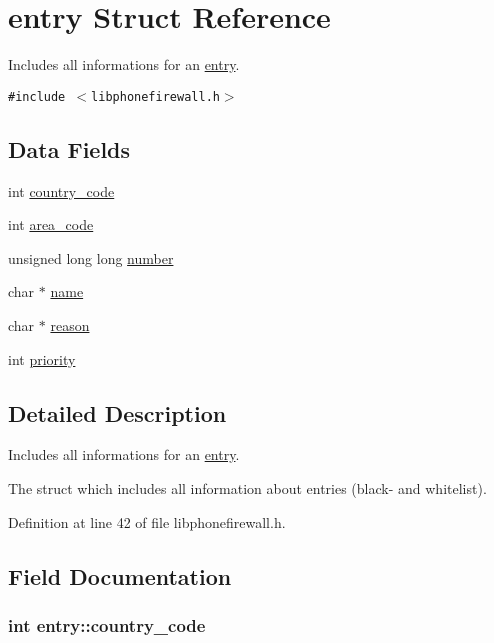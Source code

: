 \hypertarget{structentry}{
\section{entry Struct Reference}
\label{structentry}
}
Includes all informations for an \hyperlink{structentry}{entry}.  


{\tt \#include $<$libphonefirewall.h$>$}

\subsection*{Data Fields}
\begin{CompactItemize}
\item 
int \hyperlink{structentry_c226bdbc2ae976e6287e0f76d5346bff}{country\_\-code}
\item 
int \hyperlink{structentry_0e8fbe135bf7735f8675b6829ac943c3}{area\_\-code}
\item 
unsigned long long \hyperlink{structentry_ba7411d38f6779700ca594ebb2db3201}{number}
\item 
char $\ast$ \hyperlink{structentry_ef8962564a1a313a7ddc320bb4ed739c}{name}
\item 
char $\ast$ \hyperlink{structentry_1bcaeeed116744379db6ff5c671856a2}{reason}
\item 
int \hyperlink{structentry_65a11c5accccc3ac72247a12d53098d1}{priority}
\end{CompactItemize}


\subsection{Detailed Description}
Includes all informations for an \hyperlink{structentry}{entry}. 

The struct which includes all information about entries (black- and whitelist). 

Definition at line 42 of file libphonefirewall.h.

\subsection{Field Documentation}
\hypertarget{structentry_c226bdbc2ae976e6287e0f76d5346bff}{
\subsubsection{\setlength{\rightskip}{0pt plus 5cm}int {\bf entry::country\_\-code}}}
\label{structentry_c226bdbc2ae976e6287e0f76d5346bff}





